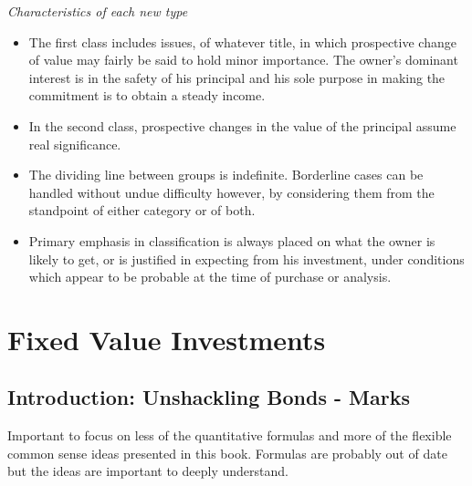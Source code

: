 \documentclass{article}
\begin{document}
\textit{Characteristics of each new type}
\begin{itemize}
\item The first class includes issues, of whatever title, in which prospective change of value may fairly be said to hold minor importance. The owner's dominant interest is in the safety of his principal and his sole purpose in making the commitment is to obtain a steady income.
\item In the second class, prospective changes in the value of the principal assume real significance. 
\item The dividing line between groups is indefinite. Borderline cases can be handled without undue difficulty however, by considering them from the standpoint of either category or of both.
\item Primary emphasis in classification is always placed on what the owner is likely to get, or is justified in expecting from his investment, under conditions which appear to be probable at the time of purchase or analysis.
\end{itemize}

\section{Fixed Value Investments}
\subsection*{Introduction: Unshackling Bonds - Marks}

Important to focus on less of the quantitative formulas and more of the flexible common sense ideas presented in this book. Formulas are probably out of date but the ideas are important to deeply understand. 
\end{document}
